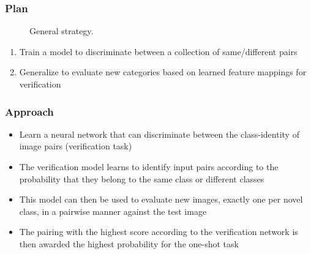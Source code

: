 \documentclass[xetex,mathserif,serif]{beamer}
\begin{document}
	\begin{frame}
		\frametitle{Plan}
    		 \begin{figure}[h]
                \caption{General strategy.}
                \label{fig:image}
            \end{figure}
			\begin{enumerate}
		 		\item Train a model to discriminate between a collection of same/different pairs
				\item Generalize to evaluate new categories based on learned feature mappings for verification
			\end{enumerate}
	\end{frame}
	
	\begin{frame}
		\frametitle{Approach}
			\begin{itemize}
				\item Learn a neural network that can discriminate between the class-identity of image pairs (verification task)
				\item The verification model learns to identify input pairs according to the probability that they belong to the same class or different classes
				\item This model can then be used to evaluate new images, exactly one per novel class, in a pairwise manner against the test image
				\item The pairing with the highest score according to the verification network is then awarded the highest probability for the one-shot task
			\end{itemize}
	\end{frame}
	
\end{document}
